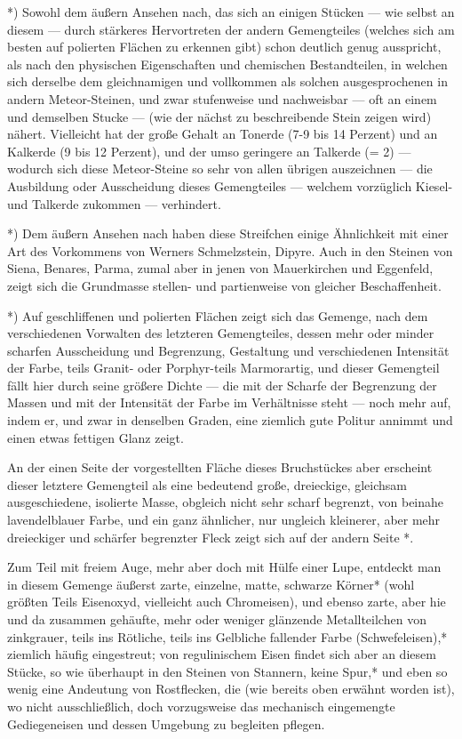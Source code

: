 \documentclass[a4paper, 11pt, oneside, german]{article}
\begin{document}
*) Sowohl dem äußern Ansehen nach, das sich an einigen Stücken --- wie selbst an diesem --- durch stärkeres Hervortreten der andern Gemengteiles (welches sich am besten auf polierten Flächen zu erkennen gibt) schon deutlich genug ausspricht, als nach den physischen Eigenschaften und chemischen Bestandteilen, in welchen sich derselbe dem gleichnamigen und vollkommen als solchen ausgesprochenen in andern Meteor-Steinen, und zwar stufenweise und nachweisbar --- oft an einem und demselben Stucke --- (wie der nächst zu beschreibende Stein zeigen wird) nähert. Vielleicht hat der große Gehalt an Tonerde (7-9 bis 14 Perzent) und an Kalkerde (9 bis 12 Perzent), und der umso geringere an Talkerde (= 2) --- wodurch sich diese Meteor-Steine so sehr von allen übrigen auszeichnen --- die Ausbildung oder Ausscheidung dieses Gemengteiles --- welchem vorzüglich Kiesel- und Talkerde zukommen --- verhindert.

*) Dem äußern Ansehen nach haben diese Streifchen einige Ähnlichkeit mit einer Art des Vorkommens von Werners Schmelzstein, Dipyre. Auch in den Steinen von Siena, Benares, Parma, zumal aber in jenen von Mauerkirchen und Eggenfeld, zeigt sich die Grundmasse stellen- und partienweise von gleicher Beschaffenheit.

*) Auf geschliffenen und polierten Flächen zeigt sich das Gemenge, nach dem verschiedenen Vorwalten des letzteren Gemengteiles, dessen mehr oder minder scharfen Ausscheidung und Begrenzung, Gestaltung und verschiedenen Intensität der Farbe, teils Granit- oder Porphyr-teils Marmorartig, und dieser Gemengteil fällt hier durch seine größere Dichte --- die mit der Scharfe der Begrenzung der Massen und mit der Intensität der Farbe im Verhältnisse steht --- noch mehr auf, indem er, und zwar in denselben Graden, eine ziemlich gute Politur annimmt und einen etwas fettigen Glanz zeigt.

An der einen Seite der vorgestellten Fläche dieses Bruchstückes aber erscheint dieser letztere Gemengteil als eine bedeutend große, dreieckige, gleichsam ausgeschiedene, isolierte Masse, obgleich nicht sehr scharf begrenzt, von beinahe lavendelblauer Farbe, und ein ganz ähnlicher, nur ungleich kleinerer, aber mehr dreieckiger und schärfer begrenzter Fleck zeigt sich auf der andern Seite *.

Zum Teil mit freiem Auge, mehr aber doch mit Hülfe einer Lupe, entdeckt man in diesem Gemenge äußerst zarte, einzelne, matte, schwarze Körner* (wohl größten Teils Eisenoxyd, vielleicht auch Chromeisen), und ebenso zarte, aber hie und da zusammen gehäufte, mehr oder weniger glänzende Metallteilchen von zinkgrauer, teils ins Rötliche, teils ins Gelbliche fallender Farbe (Schwefeleisen),* ziemlich häufig eingestreut; von regulinischem Eisen findet sich aber an diesem Stücke, so wie überhaupt in den Steinen von Stannern, keine Spur,* und eben so wenig eine Andeutung von Rostflecken, die (wie bereits oben erwähnt worden ist), wo nicht ausschließlich, doch vorzugsweise das mechanisch eingemengte Gediegeneisen und dessen Umgebung zu begleiten pflegen.
\end{document}
